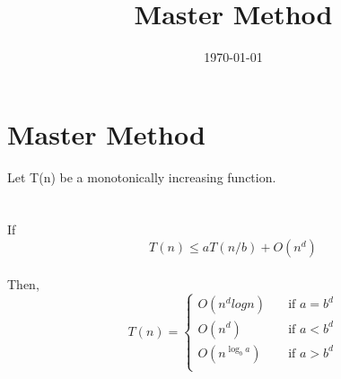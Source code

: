 \documentclass[a4paper, 12pt]{article}
\begin{document}
\title{Master Method}
\date{\today}
\section{Master Method}
	Let T(n) be a monotonically increasing function.\\
	\\
	\\
	If $$T(n) \leq aT(n/b) + O(n^d)$$
	\\
	Then,
	\[ T(n) = 
		\begin{cases}
		O(n^d log n) & \quad \text{if } a = b^d\\
		O(n^d) & \quad \text{if } a < b^d\\
		O(n^{\log_{b}a}) & \quad \text{if } a > b^d\\
		\end{cases}
	\]
\end{document}
